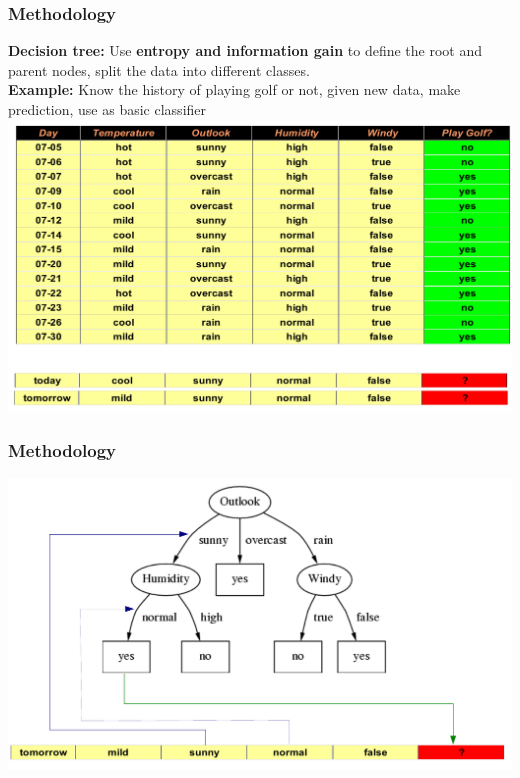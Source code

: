 \documentclass[xcolor={x11names,svgnames,dvipsnames}]{beamer}
\begin{document}
\begin{frame}
\frametitle{Methodology}
\textbf{Decision tree:}
Use \textbf{entropy and information gain} to define the root and parent nodes, split the data into different classes.\\
\textbf{Example:}
Know the history of playing golf or not, given new data, make prediction,\alert{ use as basic classifier}\\ 
      \includegraphics[width=1\textwidth, height=0.7\textheight]{decision_tree1.png}
\end{frame}

\begin{frame}
\frametitle{Methodology}


      \includegraphics[width=1\textwidth, height=0.7\textheight]{decision_tree2.png}
\end{frame}
\end{document}
